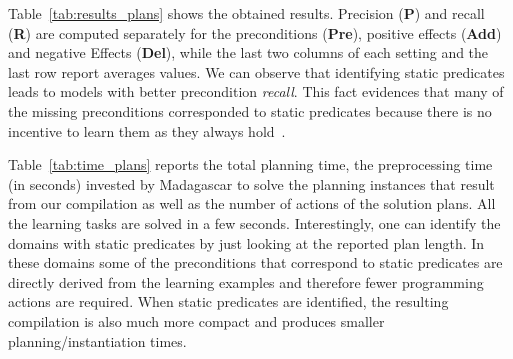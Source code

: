 \documentclass[3p,times]{elsarticle}
\begin{document}
Table~\ref{tab:results_plans} shows the obtained results. Precision ({\bf P}) and recall ({\bf R}) are computed separately for the preconditions ({\bf Pre}), positive effects ({\bf Add}) and negative Effects ({\bf Del}), while the last two columns of each setting and the last row report averages values. We can observe that identifying static predicates leads to models with better precondition {\em recall}. This fact evidences that many of the missing preconditions corresponded to static predicates because there is no incentive to learn them as they always hold~\cite{gregory2015domain}.

Table~\ref{tab:time_plans} reports the total planning time, the preprocessing time (in seconds) invested by {\sc Madagascar} to solve the planning instances that result from our compilation as well as the number of actions of the solution plans. All the learning tasks are solved in a few seconds. Interestingly, one can identify the domains with static predicates by just looking at the reported plan length. In these domains some of the preconditions that correspond to static predicates are directly derived from the learning examples and therefore fewer programming actions are required. When static predicates are identified, the resulting compilation is also much more compact and produces smaller planning/instantiation times.
\end{document}
